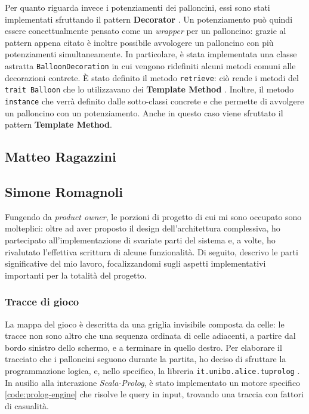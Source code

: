 

Per quanto riguarda invece i potenziamenti dei palloncini, essi sono stati implementati sfruttando il pattern
\textbf{Decorator} \cite{gof}. Un potenziamento può quindi essere concettualmente pensato come un \textit{wrapper} per un
palloncino: grazie al pattern appena citato è inoltre possibile avvologere un palloncino con più potenziamenti
simultaneamente. In particolare, è stata implementata una classe astratta \texttt{BalloonDecoration} in cui vengono
ridefiniti alcuni metodi comuni alle decorazioni contrete. È stato definito il metodo \texttt{retrieve}: ciò rende i
metodi del \texttt{trait Balloon} che lo utilizzavano dei \textbf{Template Method} \cite{gof}. Inoltre, il metodo
\texttt{instance} che verrà definito dalle sotto-classi concrete e che permette di avvolgere un palloncino con un
potenziamento. Anche in questo caso viene sfruttato il pattern \textbf{Template Method}.

\subsection{Matteo Ragazzini}

\subsection{Simone Romagnoli}
Fungendo da \textit{product owner}, le porzioni di progetto di cui mi sono occupato sono molteplici: oltre ad aver 
proposto il design dell'architettura complessiva, ho partecipato all'implementazione di svariate parti del sistema e, a 
volte, ho rivalutato l'effettiva scrittura di alcune funzionalità. Di seguito, descrivo le parti significative del mio 
lavoro, focalizzandomi sugli aspetti implementativi importanti per la totalità del progetto.

\subsubsection{Tracce di gioco}
La mappa del gioco è descritta da una griglia invisibile composta da celle: le tracce non sono altro
che una sequenza ordinata di celle adiacenti, a partire dal bordo sinistro dello schermo, e a terminare in quello
destro. Per elaborare il tracciato che i palloncini seguono durante la partita, ho deciso di sfruttare la programmazione
logica, e, nello specifico, la libreria \texttt{it.unibo.alice.tuprolog} \cite{tp}. In ausilio alla interazione
\textit{Scala-Prolog}, è stato implementato un motore specifico \ref{code:prolog-engine} che risolve le query in input,
trovando una traccia con fattori di casualità.

